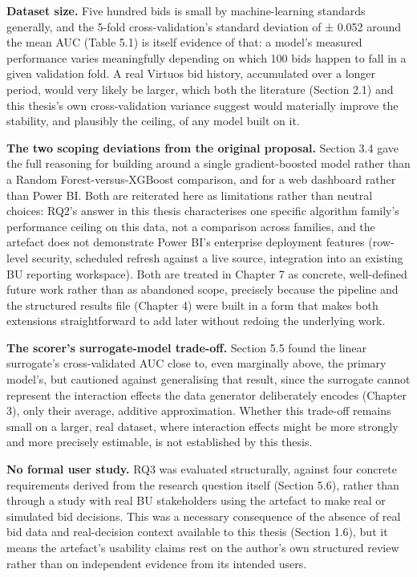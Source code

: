\documentclass[12pt,oneside]{report}
\begin{document}
\textbf{Dataset size.} Five hundred bids is small by machine-learning
standards generally, and the 5-fold cross-validation's standard
deviation of ± 0.052 around the mean AUC (Table 5.1) is itself evidence
of that: a model's measured performance varies meaningfully depending on
which 100 bids happen to fall in a given validation fold. A real Virtuos
bid history, accumulated over a longer period, would very likely be
larger, which both the literature (Section 2.1) and this thesis's own
cross-validation variance suggest would materially improve the
stability, and plausibly the ceiling, of any model built on it.

\textbf{The two scoping deviations from the original proposal.} Section
3.4 gave the full reasoning for building around a single
gradient-boosted model rather than a Random Forest-versus-XGBoost
comparison, and for a web dashboard rather than Power BI. Both are
reiterated here as limitations rather than neutral choices: RQ2's answer
in this thesis characterises one specific algorithm family's performance
ceiling on this data, not a comparison across families, and the artefact
does not demonstrate Power BI's enterprise deployment features
(row-level security, scheduled refresh against a live source,
integration into an existing BU reporting workspace). Both are treated
in Chapter 7 as concrete, well-defined future work rather than as
abandoned scope, precisely because the pipeline and the structured
results file (Chapter 4) were built in a form that makes both extensions
straightforward to add later without redoing the underlying work.

\textbf{The scorer's surrogate-model trade-off.} Section 5.5 found the
linear surrogate's cross-validated AUC close to, even marginally above,
the primary model's, but cautioned against generalising that result,
since the surrogate cannot represent the interaction effects the data
generator deliberately encodes (Chapter 3), only their average, additive
approximation. Whether this trade-off remains small on a larger, real
dataset, where interaction effects might be more strongly and more
precisely estimable, is not established by this thesis.

\textbf{No formal user study.} RQ3 was evaluated structurally, against
four concrete requirements derived from the research question itself
(Section 5.6), rather than through a study with real BU stakeholders
using the artefact to make real or simulated bid decisions. This was a
necessary consequence of the absence of real bid data and real-decision
context available to this thesis (Section 1.6), but it means the
artefact's usability claims rest on the author's own structured review
rather than on independent evidence from its intended users.
\end{document}
